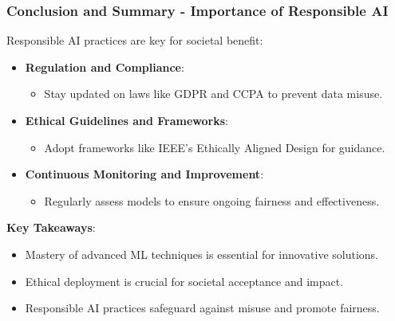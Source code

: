 \documentclass[aspectratio=169]{beamer}
\begin{document}
\begin{frame}[fragile]
    \frametitle{Conclusion and Summary - Importance of Responsible AI}
    Responsible AI practices are key for societal benefit:
    \begin{itemize}
        \item \textbf{Regulation and Compliance}: 
        \begin{itemize}
            \item Stay updated on laws like GDPR and CCPA to prevent data misuse.
        \end{itemize}

        \item \textbf{Ethical Guidelines and Frameworks}: 
        \begin{itemize}
            \item Adopt frameworks like IEEE's Ethically Aligned Design for guidance.
        \end{itemize}

        \item \textbf{Continuous Monitoring and Improvement}: 
        \begin{itemize}
            \item Regularly assess models to ensure ongoing fairness and effectiveness.
        \end{itemize}
    \end{itemize}
    
    \textbf{Key Takeaways}:
    \begin{itemize}
        \item Mastery of advanced ML techniques is essential for innovative solutions.
        \item Ethical deployment is crucial for societal acceptance and impact.
        \item Responsible AI practices safeguard against misuse and promote fairness.
    \end{itemize}
\end{frame}
\end{document}
